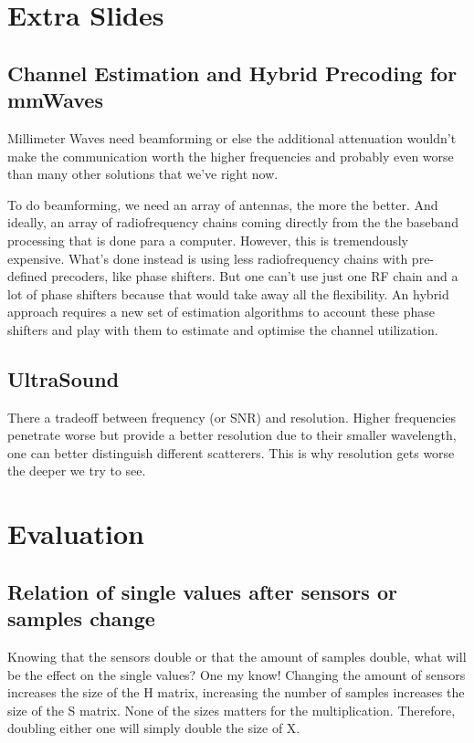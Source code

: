 \documentclass[12pt, a4paper]{article}
\begin{document}
\section{Extra Slides}

\subsection{Channel Estimation and Hybrid Precoding for mmWaves}
Millimeter Waves need beamforming or else the additional attenuation wouldn't make the communication worth the higher frequencies and probably even worse than many other solutions that we've right now.

To do beamforming, we need an array of antennas, the more the better. And ideally, an array of radiofrequency chains coming directly from the the baseband processing that is done para a computer. However, this is tremendously expensive. What's done instead is using less radiofrequency chains with pre-defined precoders, like phase shifters. But one can't use just one RF chain and a lot of phase shifters because that would take away all the flexibility. An hybrid approach requires a new set of estimation algorithms to account these phase shifters and play with them to estimate and optimise the channel utilization.

\subsection{UltraSound}
There a tradeoff between frequency (or SNR) and resolution. Higher frequencies penetrate worse but provide a better resolution due to their smaller wavelength, one can better distinguish different scatterers. This is why  resolution gets worse the deeper we try to see.






\section{Evaluation}

\subsection{Relation of single values after sensors or samples change}

Knowing that the sensors double or that the amount of samples double, what will be the effect on the single values? One my know!
Changing the amount of sensors increases the size of the H matrix, increasing the number of samples increases the size of the S matrix. None of the sizes matters for the multiplication. Therefore, doubling either one will simply double the size of X.
\end{document}
